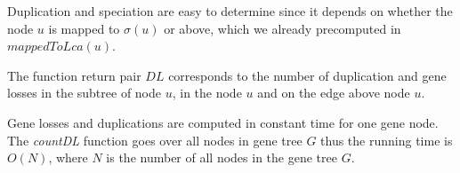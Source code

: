 Duplication and speciation are easy to determine since it depends on whether the node $u$ is mapped to $\sigma(u)$ or above, which we already precomputed in $mappedToLca(u)$.

The function return pair $DL$ corresponds to the number of duplication and gene losses in the subtree of node $u$, in the node $u$ and on the edge above node $u$.

Gene losses and duplications are computed in constant time for one gene node. The \emph{countDL} function goes over all nodes in gene tree $G$ thus the running time is $O(N)$, where $N$ is the number of all nodes in the gene tree $G$.



